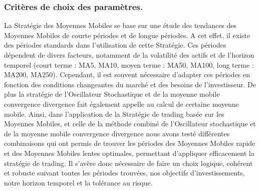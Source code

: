 \subsubsection{Critères de choix des paramètres.}
\par{
	La Stratégie des Moyennes Mobiles se base sur une étude  des tendances des Moyennes Mobiles de courte périodes 
	et de longue périodes. A cet effet, il existe des périodes standards dans l'utilisation de cette Stratégie. 
	Ces périodes dépendent de divers facteurs, notamment de la volatilité des actifs et de l'horizon 
	temporel (court terme : MA5, MA10, moyen terme : MA50, MA100, long terme : MA200, MA250). 
	Cependant, il est souvent nécessaire d'adapter ces périodes en fonction des conditions changeantes
	du marché et des besoins de l'investisseur.
	De plus la stratégie de l'Oscillateur Stochastique et de la moyenne mobile convergence divergence fait 
	également appelle au calcul de certaine moyenne mobile.
	Ainsi, dans l'application de la Stratégie de trading basée sur les Moyennes Mobiles, et celle de la 
	méthode combiné de l'Oscillateur stochastique et de la moyenne mobile convergence divergence nous avons 
	testé différentes combinaisons qui ont permis de trouver les périodes des Moyennes Mobiles 
	rapide et des Moyennes Mobiles lentes optimales, permettant d'appliquer efficacement la stratégie de trading.
	Il s'avère donc nécessaire de faire un choix logique, cohérent et robuste suivant toutes les
	périodes trouvées, nos objectifs d'investissements, notre horizon temporel et la tolérance au risque.
	
}

